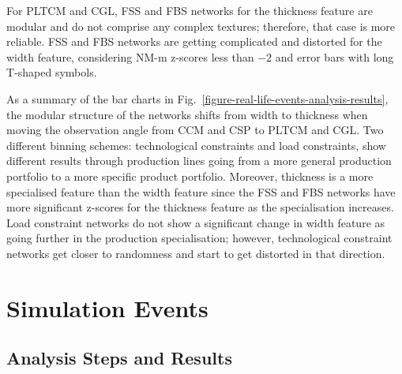 For PLTCM and CGL, FSS and FBS networks for the thickness feature are modular and do not comprise any complex textures; therefore, that case is more reliable. FSS and FBS networks are getting complicated and distorted for the width feature, considering NM-m z-scores less than $-2$ and error bars with long T-shaped symbols.

As a summary of the bar charts in Fig.~\ref{figure-real-life-events-analysis-results}, the modular structure of the networks shifts from width to thickness when moving the observation angle from CCM and CSP to PLTCM and CGL. {\color{red}Two different binning schemes: technological constraints and load constraints, show different results through production lines going from a more general production portfolio to a more specific product portfolio}. Moreover, thickness is a more specialised feature than the width feature since the FSS and FBS networks have more significant z-scores for the thickness feature as the specialisation increases. {\color{red}Load constraint networks} do not show a significant change in width feature as going further in the production specialisation; however, {\color{red}technological constraint networks} get closer to randomness and start to get distorted in that direction.
\clearpage

\section{Simulation Events}
\subsection*{Analysis Steps and Results}
%

